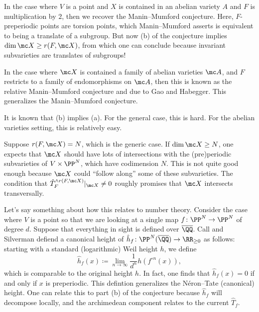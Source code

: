 \documentclass{article}
\begin{document}
\begin{example}
	In the case where $V$ is a point and $X$ is contained in an abelian variety $A$ and $F$ is multiplication by $2$, then we recover the Manin--Mumford conjecture. Here, $F$-preperiodic points are torsion points, which Manin--Mumford asserts is equivalent to being a translate of a subgroup. But now (b) of the conjecture implies $\dim\mc X\ge r(F,\mc X)$, from which one can conclude because invariant subvarieties are translates of subgroups!
\end{example}
\begin{example}
	In the case where $\mc X$ is contained a family of abelian varieties $\mc A$, and $F$ restricts to a family of endomorphisms on $\mc A$, then this is known as the relative Manin--Mumford conjecture and due to Gao and Habegger. This generalizes the Manin--Mumford conjecture.
\end{example}
\begin{remark}
	It is known that (b) implies (a). For the general case, this is hard. For the abelian varieties setting, this is relatively easy.
\end{remark}
\begin{example}
	Suppose $r(F,\mc X)=N$, which is the generic case. If $\dim\mc X\ge N$, one expects that $\mc X$ should have lots of intersections with the (pre)periodic subvarieties of $V\times\PP^N$, which have codimension $N$. This is not quite good enough because $\mc X$ could ``follow along'' some of these subvarieties. The condition that $\hat T_F^{\land r(F,\mc X)}|_{\mc X}\ne0$ roughly promises that $\mc X$ intersects transversally.
\end{example}
\begin{remark}
	Let's say something about how this relates to number theory. Consider the case where $V$ is a point so that we are looking at a single map $f\colon\PP^N\to\PP^N$ of degree $d$. Suppose that everything in sight is defined over $\overline\QQ$. Call and Silverman defiend a canonical height of $\hat h_f\colon\PP^N(\overline\QQ)\to\RR_{\ge0}$ as follows: starting with a standard (logarithmic) Weil height $h$, we define
	\[\hat h_f(x)\coloneqq\lim_{n\to\infty}\frac1{d^n}h\left(f^{\circ n}(x)\right),\]
	which is comparable to the original height $h$. In fact, one finds that $\hat h_f(x)=0$ if and only if $x$ is preperiodic. This defintion generalizes the N\'eron--Tate (canonical) height. One can relate this to part (b) of the conjecture because $\hat h_f$ will decompose locally, and the archimedean component relates to the current $\hat T_f$.
\end{remark}
\end{document}
